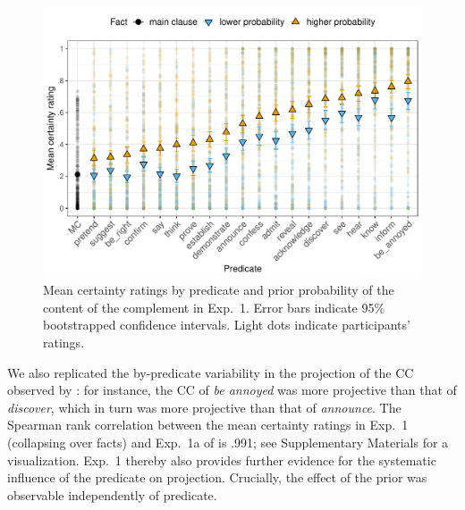 \documentclass[OpenMind]{stjour}
\begin{document}
\begin{figure}[h!]
\centering

\includegraphics[width=\textwidth]{../../results/9-prior-projection/graphs/means-projectivity-by-predicate-and-prior}

\caption{Mean certainty ratings by predicate and prior probability of the content of the complement in Exp.~1. Error bars indicate 95\% bootstrapped confidence intervals. Light dots indicate participants' ratings.} 
\label{f-projection-mean}
\end{figure}

We also replicated the by-predicate variability in the projection of the CC observed by \citep{tonhauser-degen-factive}: for instance, the CC of {\em be annoyed} was more projective than that of {\em discover}, which in turn was more projective than that of {\em announce}. The Spearman rank correlation between the mean certainty ratings in Exp.~1 (collapsing over facts) and Exp.~1a of \citep{tonhauser-degen-factive} is  .991; see Supplementary Materials for a visualization. Exp.~1 thereby also provides further evidence for the systematic influence of the predicate on projection. Crucially, the effect of the prior was observable independently of predicate.
\end{document}
